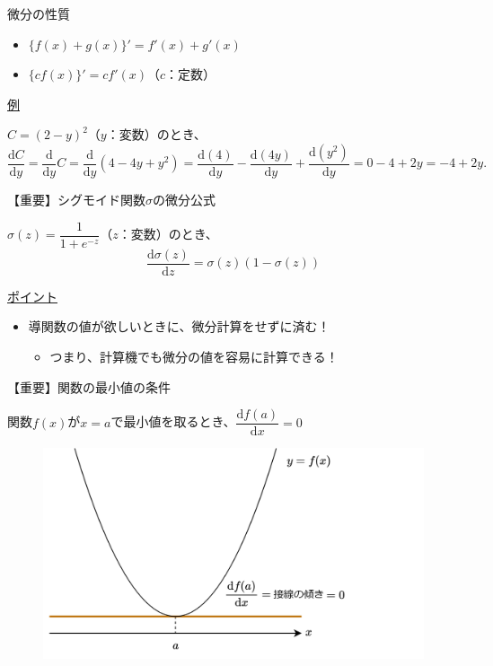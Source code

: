 \documentclass[dvipdfmx,aspectratio=169]{beamer}
\begin{document}
	\begin{frame}{微分の性質}
		\begin{itemize}
			\item $ \{f(x)+g(x)\}' = f'(x) + g'(x) $
			\item $ \{c f(x)\}' = c f'(x) $（$ c $：定数）
		\end{itemize}
		\underline{例}
		
		$ C = (2-y)^2 $（$ y $：変数）のとき、
		\begin{equation*}
			\dfrac{\mathrm{d}C}{\mathrm{d}y} = \dfrac{\mathrm{d}}{\mathrm{d}y}C = \dfrac{\mathrm{d}}{\mathrm{d}y} (4 - 4y + y^2) = \dfrac{\mathrm{d}(4)}{\mathrm{d}y} - \dfrac{\mathrm{d}(4y)}{\mathrm{d}y} + \dfrac{\mathrm{d}(y^2)}{\mathrm{d}y} = 0-4+2y = -4+2y.
		\end{equation*}
	\end{frame}
	\begin{frame}{【重要】シグモイド関数$ \sigma $の微分公式}
		\begin{screen}
			$ \sigma(z) = \dfrac{1}{1 + e^{-z}} $（$ z $：変数）のとき、
			\begin{equation*}
				\dfrac{\mathrm{d}\sigma(z)}{\mathrm{d}z} = \sigma(z)(1-\sigma(z))
			\end{equation*}
		\end{screen}
		\underline{ポイント}
		\begin{itemize}
			\item 導関数の値が欲しいときに、微分計算をせずに済む！
			\begin{itemize}
				\item つまり、計算機でも微分の値を容易に計算できる！
			\end{itemize}
		\end{itemize}
	\end{frame}
	\begin{frame}{【重要】関数の最小値の条件}
		\begin{screen}
			関数$ f(x) $が$ x=a $で最小値を取るとき、$ \dfrac{\mathrm{d}f(a)}{\mathrm{d}x} = 0 $
		\end{screen}
		\begin{figure}
			\centering
			\includegraphics[width=0.7\linewidth]{img/condition-for-minimum-value-of-function}
		\end{figure}
	\end{frame}
\end{document}
